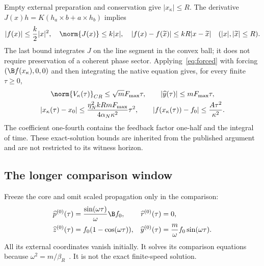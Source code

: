 Empty external preparation and conservation give $|x_\kappa|\le R$. The derivative
$J(x)h=K(h_a\times b+a\times h_b)$ implies
\begin{equation}\label{eq:ball}%
|f(x)|\le\frac k2|x|^2,\quad \norm{J(x)}\le k|x|,\quad
|f(x)-f(\widetilde x)|\le kR|x-\widetilde x|
\quad(|x|,|\widetilde x|\le R).
\end{equation}
The last bound integrates $J$ on the line segment in the convex ball; it does not require preservation of a coherent phase sector. Applying~\eqref{eq:forced} with forcing $(\B f(x_\kappa),0,0)$ and then integrating the native equation gives, for every finite $\tau\ge0$,
\begin{equation}\label{eq:drift}%
\begin{gathered}
\norm{V_\kappa(\tau)}_{CR}\le\sqrt mF_{\max}\tau,\qquad
|\widehat y(\tau)|\le mF_{\max}\tau,\\
|x_\kappa(\tau)-x_0|
\le\frac{\eta_N^2kRmF_{\max}}{4\alpha_N\kappa^2}\tau^2,\qquad
|f(x_\kappa(\tau))-f_0|\le\frac{A\tau^2}{\kappa^2}.
\end{gathered}
\end{equation}
The coefficient one-fourth contains the feedback factor one-half and the integral of time. These exact-solution bounds are inherited from the published argument~\cite[Sections 4.2--4.3]{p2} and are not restricted to its witness horizon.

\subsection{The longer comparison window}
Freeze the core and omit scaled propagation only in the comparison:
\begin{equation}\label{eq:comparison}%
\begin{aligned}
\widehat p^{(0)}(\tau)&=\frac{\sin(\omega\tau)}{\omega}\B f_0,&
\widehat r^{(0)}(\tau)&=0,\\
\widehat z^{(0)}(\tau)&=f_0(1-\cos(\omega\tau)),&
\widehat y^{(0)}(\tau)&=\frac m\omega f_0\sin(\omega\tau).
\end{aligned}
\end{equation}
All its external coordinates vanish initially. It solves its comparison equations because $\omega^2=m/\beta_R$~\cite[Section 5]{p2}. It is not the exact finite-speed solution.


